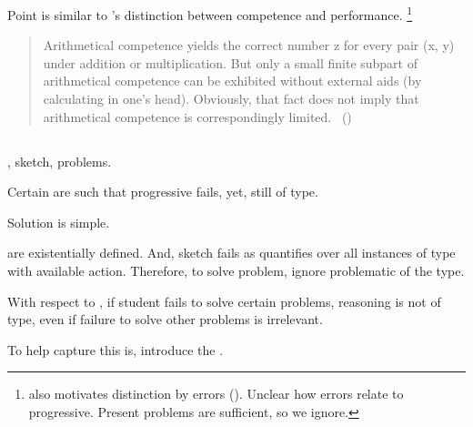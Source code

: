 \begin{note}
  Point is similar to \citeauthor{Chomsky:2015aa}'s distinction between competence and performance.%
  \footnote{
    \citeauthor{Chomsky:2015aa} also motivates distinction by errors (\citeyear[2]{Chomsky:2015aa}).
    Unclear how errors relate to progressive.
    Present problems are sufficient, so we ignore.
  }

  \begin{quote}
    Arithmetical competence yields the correct number z for every pair (x, y) under addition or multiplication.
    But only a small finite subpart of arithmetical competence can be exhibited without external aids (by calculating in one's head).
    Obviously, that fact does not imply that arithmetical competence is correspondingly limited.\newline
    \mbox{ }\hfill\mbox{(\citeyear[xii]{Chomsky:2015aa})}
  \end{quote}
\end{note}

\subsection{}

\label{cha:typical:sec:tR:RoToR}

\begin{note}
  \tor{}, sketch, problems.

  Certain  are such that progressive fails, yet, still of type.

  Solution is simple.

   are existentially defined.
  And, sketch fails as quantifies over all instances of type with available action.
  Therefore, to solve problem, ignore problematic  of the type.

  With respect to , if student fails to solve certain problems, reasoning is not of type, even if failure to solve other problems is irrelevant.

  To help capture this is, introduce the \rotor{}.
\end{note}

